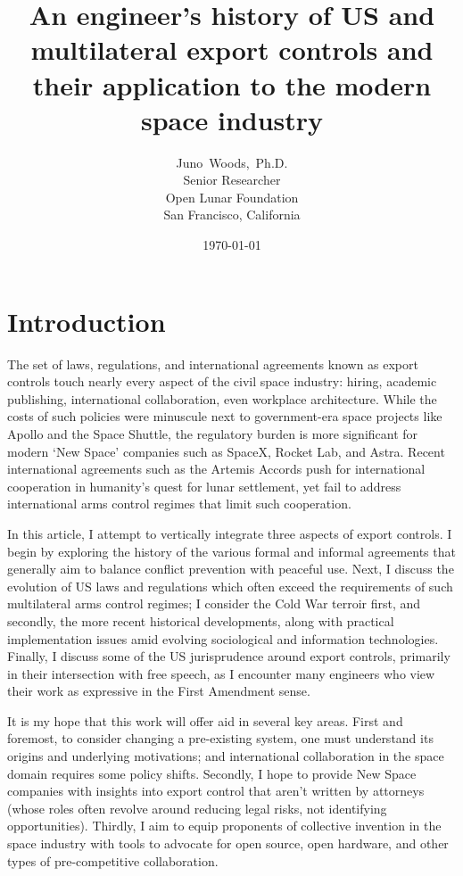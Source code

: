 \documentclass[12pt]{olfmemo}
\title{An engineer's history of US and multilateral export controls and their application to the modern space industry}
\author{
        Juno~Woods,~Ph.D. \\
        Senior Researcher\\
        Open Lunar Foundation\\
        San Francisco, California
}
\date{\today}
\begin{document}
\maketitle

\section{Introduction}
The set of laws, regulations, and international agreements known as export controls touch nearly every aspect of the civil space industry: hiring, academic publishing, international collaboration, even workplace architecture. While the costs of such policies were minuscule next to government-era space projects like Apollo and the Space Shuttle, the regulatory burden is more significant for modern `New Space' companies such as SpaceX, Rocket Lab, and Astra. Recent international agreements such as the Artemis Accords push for international cooperation in humanity's quest for lunar settlement, yet fail to address international arms control regimes that limit such cooperation.

In this article, I attempt to vertically integrate three aspects of export controls. I begin by exploring the history of the various formal and informal agreements that generally aim to balance conflict prevention with peaceful use. Next, I discuss the evolution of US laws and regulations which often exceed the requirements of such multilateral arms control regimes; I consider the Cold War terroir first, and secondly, the more recent historical developments, along with practical implementation issues amid evolving sociological and information technologies. Finally, I discuss some of the US jurisprudence around export controls, primarily in their intersection with free speech, as I encounter many engineers who view their work as expressive in the First Amendment sense.

It is my hope that this work will offer aid in several key areas. First and foremost, to consider changing a pre-existing system, one must understand its origins and underlying motivations; and international collaboration in the space domain requires some policy shifts. Secondly, I hope to provide New Space companies with insights into export control that aren't written by attorneys (whose roles often revolve around reducing legal risks, not identifying opportunities). Thirdly, I aim to equip proponents of collective invention in the space industry with tools to advocate for open source, open hardware, and other types of pre-competitive collaboration.
\end{document}
